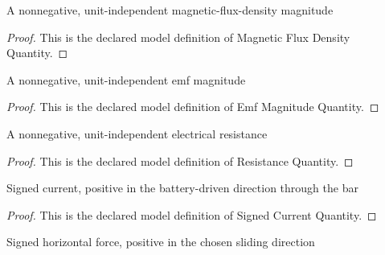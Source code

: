\begin{definition}
  \label{def:physics:phyx-mini-0976:phyxminiproblems-problemphyxmini0976-magneticfluxdensityquantity}
  A nonnegative, unit-independent magnetic-flux-density magnitude
\end{definition}
\begin{proof}
  This is the declared model definition of Magnetic Flux Density Quantity.
\end{proof}
\begin{definition}
  \label{def:physics:phyx-mini-0976:phyxminiproblems-problemphyxmini0976-emfmagnitudequantity}
  A nonnegative, unit-independent emf magnitude
\end{definition}
\begin{proof}
  This is the declared model definition of Emf Magnitude Quantity.
\end{proof}
\begin{definition}
  \label{def:physics:phyx-mini-0976:phyxminiproblems-problemphyxmini0976-resistancequantity}
  A nonnegative, unit-independent electrical resistance
\end{definition}
\begin{proof}
  This is the declared model definition of Resistance Quantity.
\end{proof}
\begin{definition}
  \label{def:physics:phyx-mini-0976:phyxminiproblems-problemphyxmini0976-signedcurrentquantity}
  Signed current, positive in the battery-driven direction through the bar
\end{definition}
\begin{proof}
  This is the declared model definition of Signed Current Quantity.
\end{proof}
\begin{definition}
  \label{def:physics:phyx-mini-0976:phyxminiproblems-problemphyxmini0976-signedforcequantity}
  Signed horizontal force, positive in the chosen sliding direction
\end{definition}
